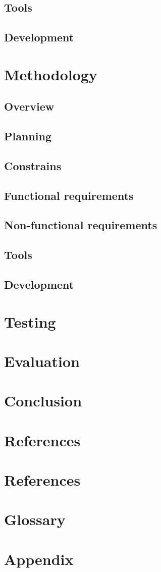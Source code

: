 \documentclass{article}
\begin{document}
  \subsection{Tools}
  \subsection{Development}

  \newpage
  \section{Methodology}
  \subsection{Overview}
  \subsection{Planning}
  \subsection{Constrains}
  \subsection{Functional requirements}
  \subsection{Non-functional requirements}
  \subsection{Tools}
  \subsection{Development}

  \newpage
  \section{Testing}

  \newpage
  \section{Evaluation}

  \newpage
  \section{Conclusion}

  \newpage
  \section{References}

  \newpage
  \section{References}

  \newpage
  \section{Glossary}

  \newpage
  \section{Appendix}
\end{document}
